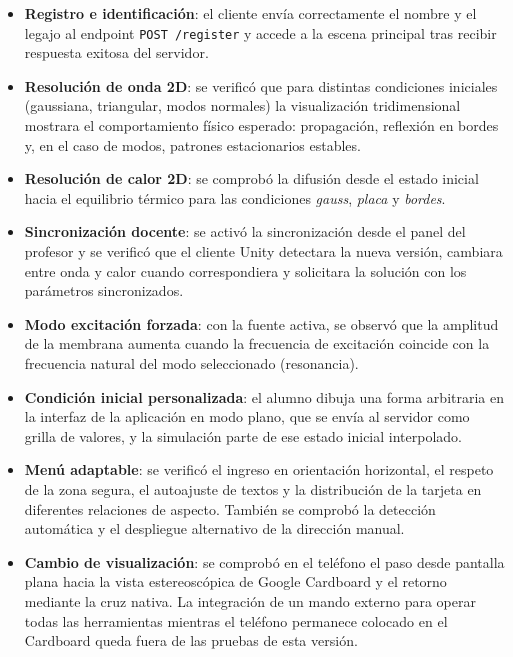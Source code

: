 \documentclass[12pt, a4paper]{article}
\begin{document}
\begin{itemize}
    \item \textbf{Registro e identificación}: el cliente envía correctamente el
    nombre y el legajo al endpoint \texttt{POST /register} y accede a la escena principal
    tras recibir respuesta exitosa del servidor.

    \item \textbf{Resolución de onda 2D}: se verificó que para distintas condiciones
    iniciales (gaussiana, triangular, modos normales) la visualización tridimensional
    mostrara el comportamiento físico esperado: propagación, reflexión en bordes y,
    en el caso de modos, patrones estacionarios estables.

    \item \textbf{Resolución de calor 2D}: se comprobó la difusión desde el estado
    inicial hacia el equilibrio térmico para las condiciones \textit{gauss},
    \textit{placa} y \textit{bordes}.

    \item \textbf{Sincronización docente}: se activó la sincronización desde el
    panel del profesor y se verificó que el cliente Unity detectara la nueva versión,
    cambiara entre onda y calor cuando correspondiera y solicitara la solución con los
    parámetros sincronizados.

    \item \textbf{Modo excitación forzada}: con la fuente activa, se observó que la
    amplitud de la membrana aumenta cuando la frecuencia de excitación coincide con
    la frecuencia natural del modo seleccionado (resonancia).

    \item \textbf{Condición inicial personalizada}: el alumno dibuja una forma
    arbitraria en la interfaz de la aplicación en modo plano, que se envía al servidor como grilla de valores,
    y la simulación parte de ese estado inicial interpolado.

    \item \textbf{Menú adaptable}: se verificó el ingreso en orientación horizontal,
    el respeto de la zona segura, el autoajuste de textos y la distribución de la
    tarjeta en diferentes relaciones de aspecto. También se comprobó la detección
    automática y el despliegue alternativo de la dirección manual.

    \item \textbf{Cambio de visualización}: se comprobó en el teléfono el paso desde
    pantalla plana hacia la vista estereoscópica de Google Cardboard y el retorno
    mediante la cruz nativa. La integración
    de un mando externo para operar todas las herramientas mientras el teléfono permanece
    colocado en el Cardboard queda fuera de las pruebas de esta versión.
\end{itemize}
\end{document}
